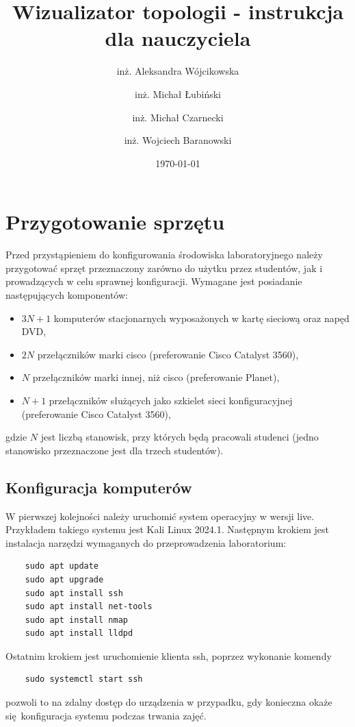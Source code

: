 \documentclass[polish,envcountsect,10pt]{article}
\title{Wizualizator topologii - instrukcja dla nauczyciela}
\author{inż. Aleksandra Wójcikowska \and inż. Michał Łubiński \and inż. Michał Czarnecki \and inż. Wojciech Baranowski}
\date{\today}
\begin{document}
\maketitle

\tableofcontents

\section{Przygotowanie sprzętu}

Przed przystąpieniem do konfigurowania środowiska laboratoryjnego należy przygotować sprzęt przeznaczony zarówno do użytku przez studentów, jak i prowadzących w celu sprawnej konfiguracji. Wymagane jest posiadanie następujących komponentów:
\begin{itemize}
	\item $3N + 1$ komputerów stacjonarnych wyposażonych w kartę sieciową oraz napęd DVD,
	\item $2N$ przełączników marki cisco (preferowanie Cisco Catalyst 3560),
	\item $N$ przełączników marki innej, niż cisco (preferowanie Planet),
	\item $N + 1$ przełączników służących jako szkielet sieci konfiguracyjnej (preferowanie Cisco Catalyst 3560),
\end{itemize}
gdzie $N$ jest liczbą stanowisk, przy których będą pracowali studenci (jedno stanowisko przeznaczone jest dla trzech studentów).

\subsection{Konfiguracja komputerów}

W pierwszej kolejności należy uruchomić system operacyjny w wersji live. Przykładem takiego systemu jest Kali Linux 2024.1. Następnym krokiem jest instalacja narzędzi wymaganych do przeprowadzenia laboratorium:
\begin{verbatim}
	sudo apt update
	sudo apt upgrade
	sudo apt install ssh
	sudo apt install net-tools 
	sudo apt install nmap
	sudo apt install lldpd
\end{verbatim}

Ostatnim krokiem jest uruchomienie klienta ssh, poprzez wykonanie komendy
\begin{verbatim}
	sudo systemctl start ssh
\end{verbatim}
pozwoli to na zdalny dostęp do urządzenia w przypadku, gdy konieczna okaże się konfiguracja systemu podczas trwania zajęć. 
\end{document}
